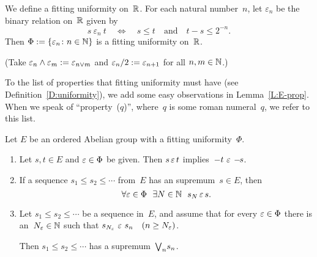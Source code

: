 \documentclass[main.tex]{subfiles}
\begin{document}
\begin{ex}
We define a fitting uniformity on~$\mathbb{R}$.
For each natural number~$n$,
let $\varepsilon_n$ be the binary relation
on~$\mathbb{R}$ given by 
\begin{equation*}
s \ \varepsilon_n\  t
\quad\iff\quad 
s\leq t\quad\text{and}\quad t-s \leq 2^{-n}.
\end{equation*}
Then $\Phi:= \{ \varepsilon_n \colon n\in \mathbb{N} \}$
is a fitting uniformity on~$\mathbb{R}$.

(Take $\varepsilon_n \wedge \varepsilon_m := \varepsilon_{n\vee m}$
and $\varepsilon_n / 2 := \varepsilon_{n+1}$
for all $n,m\in \mathbb{N}$.)
\end{ex}

%
%
To the list of properties 
that fitting uniformity must have (see Definition~\ref{D:uniformity}),
we add 
some easy observations
in Lemma~\ref{L:E-prop}.
When we speak of ``property~($q$)'',
where~$q$ is some roman numeral~$q$,
we refer to this list.
\begin{lem}
\label{L:E-prop}
Let $E$ be an ordered Abelian group
with a fitting uniformity~$\Phi$.
\begin{enumerate}
\setcounter{enumi}{\value{epropc}}
\item \label{E-minus}
Let $s,t\in E$ and $\varepsilon \in \Phi$ be given.
Then $s \,\varepsilon\, t$ implies\, $-t \ \varepsilon\,-\!\!s$.

\item \label{E-sup-conv}
If a sequence $s_1 \leq s_2 \leq \dotsb$ from~$E$
has an supremum~$s\in E$,
then 
\begin{equation*}
\forall\varepsilon\in \Phi
\ \ \exists N\in \mathbb{N}
\ \ s_N \, \varepsilon\, s.
\end{equation*}

\item  \label{E-bound-sup}
Let $s_1\leq s_2 \leq \dotsb$ be a
sequence in~$E$,
and assume that
for every $\varepsilon\in \Phi$
there is an~$N_\varepsilon \in \mathbb{N}$ such that 
$s_{N_\varepsilon} \ \varepsilon \ s_n\quad (n\geq N_\varepsilon)$.

Then $s_1 \leq s_2 \leq \dotsb$ has a supremum~$\textstyle{\bigvee}_n s_n$.
\end{enumerate}
\end{lem}
\end{document}
